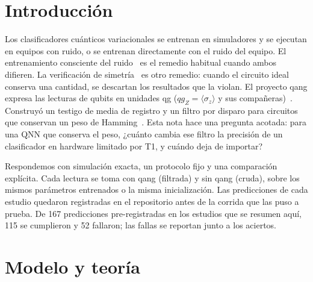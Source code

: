 \documentclass[11pt]{article}
\newcommand{\qZ}{qg_Z}
\begin{document}
\begin{abstract}
de ruido de equipos la calibración por eco revierte confusiones de clase: las decisiones cambiadas del modelo de cinco
clases bajan de 51 (crudo) y 24 (filtro) a 15 en 500 lecturas. El eco ayudó solo donde el error filtrado estaba bien por
encima del ruido de disparo, y con 8 qubits todavía quitó un tercio del error filtrado con una matriz de $28\times28$. Estos modelos son
simulables clásicamente y no
se afirma ventaja cuántica. El filtro es una manera de hacer válido el entrenamiento sin ruido bajo relajación,
con un costo en disparos conocido de antemano. Los modelos se publican como \texttt{qang.qml} (versión 0.7.0,
\texttt{pip install qang}).
\end{abstract}

\section{Introducción}

Los clasificadores cuánticos variacionales se entrenan en simuladores y se ejecutan en equipos con ruido, o se
entrenan directamente con el ruido del equipo. El entrenamiento consciente del ruido~\cite{wang2022quantumnat}
es el remedio habitual cuando ambos difieren. La verificación de simetría~\cite{bonetmonroig2018,mcardle2019}
es otro remedio: cuando el circuito ideal conserva una cantidad, se descartan los resultados que la violan. El
proyecto qang expresa las lecturas de qubits en unidades qg ($\qZ=\langle\sigma_z\rangle$ y sus
compañeras)~\cite{monteverde2026qang}. Construyó un testigo de media de registro y un filtro por disparo para
circuitos que conservan un peso de Hamming~\cite{monteverde2026witness}. Esta nota hace una pregunta acotada:
para una QNN que conserva el peso, ¿cuánto cambia ese filtro la precisión de un clasificador en hardware
limitado por T1, y cuándo deja de importar?

Respondemos con simulación exacta, un protocolo fijo y una comparación explícita. Cada lectura se toma con qang
(filtrada) y sin qang (cruda), sobre los mismos parámetros entrenados o la misma inicialización. Las
predicciones de cada estudio quedaron registradas en el repositorio antes de la corrida que las puso a prueba.
De 167 predicciones pre-registradas en los estudios que se resumen aquí, 115 se cumplieron y 52 fallaron; las
fallas se reportan junto a los aciertos.

\section{Modelo y teoría}
\end{document}
